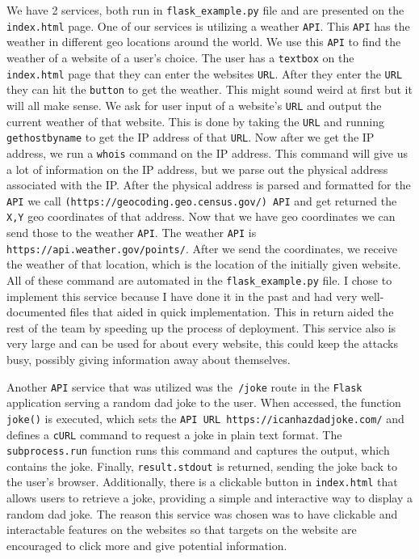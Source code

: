 We have 2 services, both run in \verb+flask_example.py+ file and are presented on the \verb+index.html+ page. One of our services is utilizing a weather \verb+API+. This \verb+API+ has the weather in different geo locations around the world. We use this \verb+API+ to find the weather of a website of a user's choice. The user has a \verb+textbox+ on the \verb+index.html+ page that they can enter the websites \verb+URL+. After they enter the \verb+URL+ they can hit the \verb+button+ to get the weather. This might sound weird at first but it will all make sense. We ask for user input of a website's \verb+URL+ and output the current weather of that website. This is done by taking the \verb+URL+ and running \verb+gethostbyname+ to get the IP address of that \verb+URL+. Now after we get the IP address, we run a \verb+whois+ command on the IP address. This command will give us a lot of information on the IP address, but we parse out the physical address associated with the IP. After the physical address is parsed and formatted for the \verb+API+ we call \verb+(https://geocoding.geo.census.gov/) API+ and get returned the \verb+X,Y+ geo coordinates of that address. Now that we have geo coordinates we can send those to the weather \verb+API+. The weather \verb+API+ is \verb+https://api.weather.gov/points/+. After we send the coordinates, we receive the weather of that location, which is the location of the initially given website. All of these command are automated in the \verb+flask_example.py+ file. I chose to implement this service because I have done it in the past and had very well-documented files that aided in quick implementation. This in return aided the rest of the team by speeding up the process of deployment. This service also is very large and can be used for about every website, this could keep the attacks busy, possibly giving information away about themselves.

Another \verb+API+ service that was utilized was the\verb+ /joke+ route in the \verb+Flask+ application serving a random dad joke to the user. When accessed, the function \verb+joke()+ is executed, which sets the \verb+API URL https://icanhazdadjoke.com/+ and defines a \verb+cURL+ command to request a joke in plain text format. The \verb+subprocess.run+ function runs this command and captures the output, which contains the joke. Finally,  \verb+result.stdout+ is returned, sending the joke back to the user's browser. Additionally, there is a clickable button in \verb+index.html+ that allows users to retrieve a joke, providing a simple and interactive way to display a random dad joke. The reason this service was chosen was to have clickable and interactable features on the websites so that targets on the website are encouraged to click more and give potential information.
